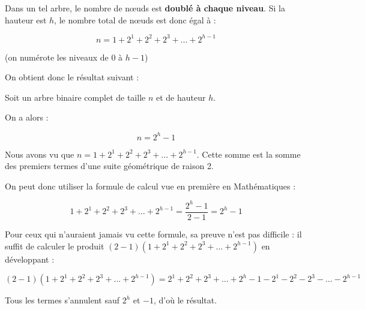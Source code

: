 \documentclass[
  a4paper,
  DIV=11,
  numbers=noendperiod]{scrartcl}
\begin{document}
Dans un tel arbre, le nombre de nœuds est \textbf{doublé à chaque
niveau}. Si la hauteur est \(h\), le nombre total de nœuds est donc égal
à :

\[n=1+2^1+2^2+2^3+\ldots+2^{h-1}\]

(on numérote les niveaux de \(0\) à \(h-1\))

On obtient donc le résultat suivant :

\begin{tcolorbox}[enhanced jigsaw, titlerule=0mm, opacityback=0, toptitle=1mm, opacitybacktitle=0.6, breakable, colback=white, title=\textcolor{quarto-callout-important-color}{\faExclamation}\hspace{0.5em}{Lien entre hauteur et taille d'un arbre binaire complet}, bottomtitle=1mm, arc=.35mm, colbacktitle=quarto-callout-important-color!10!white, rightrule=.15mm, bottomrule=.15mm, leftrule=.75mm, toprule=.15mm, left=2mm, coltitle=black]

Soit un arbre binaire complet de taille \(n\) et de hauteur \(h\).

On a alors :

\[n=2^h-1\]

\end{tcolorbox}

\begin{tcolorbox}[enhanced jigsaw, titlerule=0mm, opacityback=0, toptitle=1mm, opacitybacktitle=0.6, breakable, colback=white, title=\textcolor{quarto-callout-caution-color}{\faFire}\hspace{0.5em}{Preuve}, bottomtitle=1mm, arc=.35mm, colbacktitle=quarto-callout-caution-color!10!white, rightrule=.15mm, bottomrule=.15mm, leftrule=.75mm, toprule=.15mm, left=2mm, coltitle=black]

Nous avons vu que \(n=1+2^1+2^2+2^3+\ldots+2^{h-1}\). Cette somme est la
somme des premiers termes d'une suite géométrique de raison 2.

On peut donc utiliser la formule de calcul vue en première en
Mathématiques :

\[1+2^1+2^2+2^3+\ldots+2^{h-1} = \frac{2^h-1}{2-1}=2^h-1\]

Pour ceux qui n'auraient jamais vu cette formule, sa preuve n'est pas
difficile : il suffit de calculer le produit
\((2-1)(1+2^1+2^2+2^3+\ldots+2^{h-1})\) en développant :

\[(2-1)(1+2^1+2^2+2^3+\ldots+2^{h-1})= 2^1+2^2+2^3+\ldots+2^{h} -1-2^1-2^2-2^3-\ldots-2^{h-1}\]

Tous les termes s'annulent sauf \(2^{h}\) et \(-1\), d'où le résultat.

\end{tcolorbox}
\end{document}
